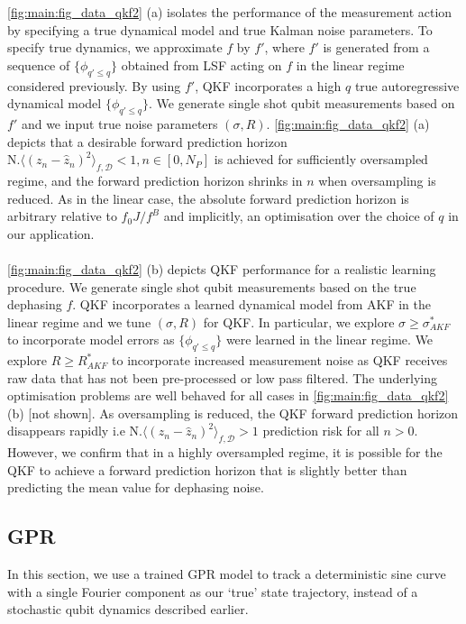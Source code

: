 \documentclass[pra, reprint]{revtex4-1}
\begin{document}
\cref{fig:main:fig_data_qkf2} (a) isolates the performance of the measurement action by specifying a true dynamical model and true Kalman noise parameters. To specify true dynamics, we approximate $f$ by $f'$, where $f'$ is generated from a sequence of $\{ \phi_{q'\leq q}\}$ obtained from LSF acting on $f$ in the linear regime considered previously. By using $f'$, QKF incorporates a high $q$ true autoregressive dynamical model $\{ \phi_{q'\leq q}\}$. We generate single shot qubit measurements based on $f'$ and we input true noise parameters $(\sigma, R)$. \cref{fig:main:fig_data_qkf2} (a) depicts that a desirable forward prediction horizon $\text{N.} \langle (z_n - \hat{z}_n)^2 \rangle_{f, \mathcal{D}} < 1, n\in [0, N_P] $ is achieved for sufficiently oversampled regime, and the forward prediction horizon shrinks in $n$ when oversampling is reduced. As in the linear case, the absolute forward prediction horizon is arbitrary relative to $f_0 J / f^B$ and implicitly, an optimisation over the choice of $q$ in our application. 
\\
\\
\cref{fig:main:fig_data_qkf2} (b) depicts QKF performance for a realistic learning procedure. We generate single shot qubit measurements based on the true dephasing $f$. QKF incorporates a learned dynamical model from AKF in the linear regime and we tune $(\sigma, R)$ for QKF. In particular, we explore $\sigma \geq \sigma_{AKF}^*$ to incorporate model errors as $\{\phi_{q' \leq q}\}$ were learned in the linear regime.  We explore $R \geq R_{AKF}^*$ to incorporate increased measurement noise as QKF receives raw data that has not been pre-processed or low pass filtered. The underlying optimisation problems are well behaved for all cases in \cref{fig:main:fig_data_qkf2}(b) [not shown]. As oversampling is reduced, the QKF forward prediction horizon disappears rapidly i.e $\text{N.} \langle (z_n - \hat{z}_n)^2 \rangle_{f, \mathcal{D}} > 1 $ prediction risk for all $n>0$.  However, we confirm that in a highly oversampled regime, it is possible for the QKF to achieve a forward prediction horizon that is slightly better than predicting the mean value for dephasing noise. 

\subsection{GPR} 
In this section, we use a trained GPR model to track a deterministic sine curve with a single Fourier component as our `true' state trajectory, instead of a stochastic qubit dynamics described earlier. 
\end{document}
